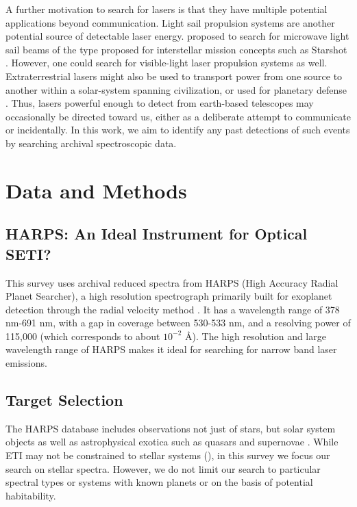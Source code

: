 \documentclass[linenumbers]{aastex631}
\begin{document}
A further motivation to search for lasers is that they have multiple potential applications beyond communication. Light sail propulsion systems are another potential source of detectable laser energy. \cite{Guillochon_2015} proposed to search for microwave light sail beams of the type proposed for interstellar mission concepts such as Starshot \citep{STARSHOT}. However, one could search for visible-light laser propulsion systems as well. Extraterrestrial lasers might also be used to transport power from one source to another within a solar-system spanning civilization, or used for planetary defense \citep{Bible_Johansson_Hughes_Lubin_2013}. Thus, lasers powerful enough to detect from earth-based telescopes may occasionally be directed toward us, either as a deliberate attempt to communicate or incidentally. In this work, we aim to identify any past detections of such events by searching archival spectroscopic data.

\section{Data and Methods}
\subsection{HARPS: An Ideal Instrument for Optical SETI?}
This survey uses archival reduced spectra from HARPS (High Accuracy Radial Planet Searcher), a high resolution spectrograph primarily built for exoplanet detection through the radial velocity method \citep{HARPS_specs}. It has a wavelength range of 378 nm-691 nm, with a gap in coverage between 530-533 nm, and a resolving power of 115,000 \citep{HARPS_specs} (which corresponds to about $10^{-2}$ \AA). The high resolution and large wavelength range of HARPS makes it ideal for searching for narrow band laser emissions. 

\subsection{Target Selection}
The HARPS database includes observations not just of stars, but solar system objects as well as  astrophysical exotica such as quasars and supernovae \citep{trifonov_2020}.  While ETI may not be constrained to stellar systems (\citep{CIRKOVIC2018289}), in this survey we focus our search on stellar spectra. However, we do not limit our search to particular spectral types or systems with known planets or on the basis of potential habitability.
\end{document}
